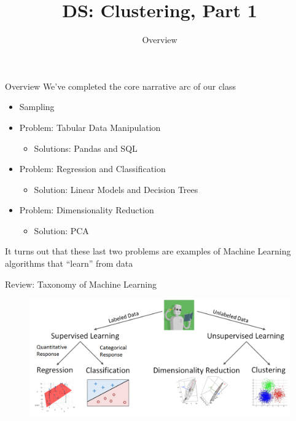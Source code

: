 \documentclass[aspectratio=169]{../latex_main/tntbeamer}  %
\title[Introduction]{DS: Clustering, Part 1}
\subtitle{Overview}
\begin{document}
	
	\maketitle
	\begin{frame}{Overview}
	    We’ve completed the core narrative arc of our class
	    \begin{itemize}
	        \item Sampling
	        \item Problem: Tabular Data Manipulation
	        \begin{itemize}
	            \item Solutions: Pandas and SQL
	        \end{itemize}
	        \item Problem: Regression and Classification
	        \begin{itemize}
	            \item Solution: Linear Models and Decision Trees
	        \end{itemize}
	        \item Problem: Dimensionality Reduction
	        \begin{itemize}
	            \item Solution: PCA
	        \end{itemize}
	    \end{itemize}
	    It turns out that these last two problems are examples of Machine Learning algorithms that “learn” from data
	\end{frame}
	
	
	\begin{frame}{Review: Taxonomy of Machine Learning}
	    \begin{figure}
	        \centering
	        \includegraphics[scale=.4]{Bild1}
	    \end{figure}
	\end{frame}
	
\end{document}
